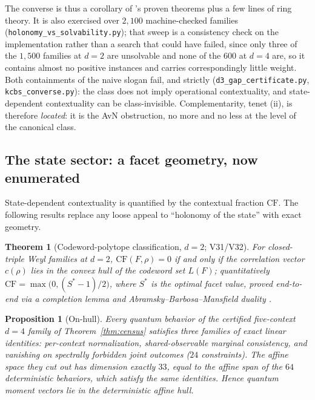 \documentclass[11pt]{article}
\newtheorem{theorem}{Theorem}
\newtheorem{proposition}{Proposition}
\theoremstyle{definition}
\theoremstyle{remark}
\newcommand{\CF}{\mathrm{CF}}
\begin{document}
The converse is thus a corollary of \cite{paperB}'s proven theorems plus a few lines of
ring theory. It is also exercised over $2{,}100$ machine-checked families
(\texttt{holonomy\_vs\_solvability.py}); that sweep is a consistency check on the
implementation rather than a search that could have failed, since only three of the
$1{,}500$ families at $d=2$ are unsolvable and none of the $600$ at $d=4$ are, so it
contains almost no positive instances and carries correspondingly little weight.
Both containments of the naive slogan fail, and strictly
(\texttt{d3\_gap\_certificate.py}, \texttt{kcbs\_converse.py}): the class does not imply
operational contextuality, and state-dependent contextuality can be class-invisible.
Complementarity, tenet (ii), is therefore \emph{located}: it is the AvN obstruction, no
more and no less at the level of the canonical class.

\subsection{The state sector: a facet geometry, now enumerated}\label{sec:state}
State-dependent contextuality is quantified by the contextual fraction $\CF$. The
following results replace any loose appeal to ``holonomy of the state'' with exact
geometry.

\begin{theorem}[Codeword-polytope classification, $d=2$; V31/V32]\label{thm:d2}
For closed-triple Weyl families at $d=2$, $\CF(F,\rho)=0$ if and only if the correlation
vector $c(\rho)$ lies in the convex hull of the codeword set $L(F)$; quantitatively
$\CF=\max\bigl(0,(S^*-1)/2\bigr)$, where $S^*$ is the optimal facet value, proved
end-to-end via a completion lemma and Abramsky--Barbosa--Mansfield duality \cite{ABM}.
\end{theorem}

\begin{proposition}[On-hull]\label{lem:onhull}
Every quantum behavior of the certified five-context $d=4$ family of
Theorem~\ref{thm:census} satisfies three families of exact linear
identities: per-context normalization, shared-observable marginal consistency, and
vanishing on spectrally forbidden joint outcomes ($24$ constraints). The affine space
they cut out has dimension exactly $33$, equal to the affine span of the $64$
deterministic behaviors, which satisfy the same identities. Hence quantum moment
vectors lie in the deterministic affine hull.
\end{proposition}
\end{document}
